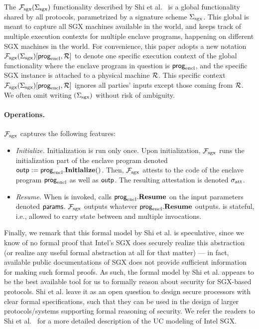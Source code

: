 The $\mathcal{F}_{\textrm{sgx}}({\Sigma_{\textrm{sgx}}})$ functionality described by Shi et al.~\cite{sgxsok} %
is a global functionality shared by all protocols, parametrized
by a signature scheme ${\Sigma_{\textrm{sgx}}}$.
This global \fsgx 
is meant to capture all SGX machines available in the world,
and keeps track of 
multiple execution contexts
for multiple enclave programs, happening on different SGX machines in the world.
For convenience, 
this paper adopts a new notation
$\mathcal{F}_{\textrm{sgx}}({\Sigma_{\textrm{sgx}}})[{\sf prog}_{\textrm{encl}}, \mathcal{R}]$
to denote 
one specific execution context of the global \fsgx
functionality where the enclave program in question is ${\sf prog}_{\textrm{encl}}$,
and the specific SGX instance is attached to a physical machine $\mathcal{R}$.
This specific context 
$\mathcal{F}_{\textrm{sgx}}({\Sigma_{\textrm{sgx}}})[{\sf prog}_{\textrm{encl}}, \mathcal{R}]$
ignores all parties' inputs except those coming from $\mathcal{R}$.
We often omit writing $({\Sigma_{\textrm{sgx}}})$ without risk of ambiguity.


\paragraph{Operations.}
$\mathcal{F}_{\textrm{sgx}}$ captures the following features:
\begin{itemize}[leftmargin=5mm]
\item
{\it Initialize.}
Initialization is run only once.
Upon initialization, $\mathcal{F}_{\textrm{sgx}}$
runs the initialization part of the enclave program
denoted ${\sf outp} := {\sf prog}_{\textrm{encl}}.{\bf Initialize}()$.
Then, $\mathcal{F}_{\textrm{sgx}}$ 
attests to the code of the enclave program ${\sf prog}_{\textrm{encl}}$ 
as well as ${\sf outp}$.
The resulting attestation is denoted 
${\sigma_{\textrm{att}}}$.
\item
{\it Resume.}
When  is invoked,
\fsgx 
calls ${\sf prog}_{\textrm{encl}}.{\bf Resume}$
on the input parameters denoted ${\sf params}$.
$\mathcal{F}_{\textrm{sgx}}$ 
outputs whatever ${\sf prog}_{\textrm{encl}}.{\bf Resume}$ outputs.
\fsgx is stateful, i.e., allowed to carry state
between  and multiple 
invocations.
\end{itemize}

Finally, we remark that this formal model by Shi et al.
is speculative,   
since we know of no formal
proof that Intel's SGX does securely realize this abstraction (or 
realize any useful formal
abstraction at all for that matter) --- 
in fact, available public documentations of SGX
does not provide sufficient information for making such formal proofs. 
As such, the formal model by Shi et al. 
appears to be the best available tool for us to 
formally reason about 
security 
for SGX-based protocols. 
Shi et al. leave it as an open question to design secure processors
with clear formal specifications, such that 
they can be used in the design of larger protocols/systems 
supporting formal reasoning of security.
We refer the readers to Shi et al.~\cite{sgxsok} 
for a more detailed description of the UC modeling of Intel SGX.



